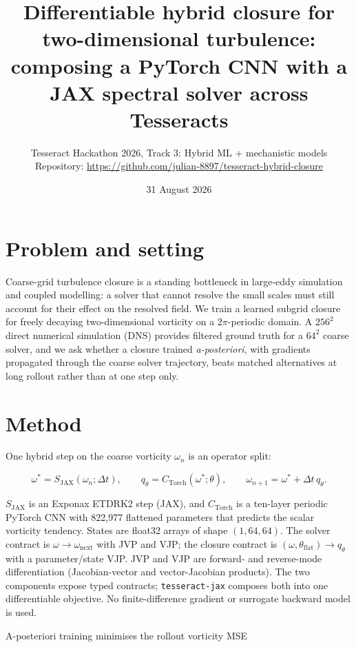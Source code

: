 \documentclass[10pt]{article}
\title{\textbf{Differentiable hybrid closure for two-dimensional turbulence:\\composing a PyTorch CNN with a JAX spectral solver across Tesseracts}}
\author{Tesseract Hackathon 2026, Track 3: Hybrid ML + mechanistic models\\[2pt]
\small Repository: \url{https://github.com/julian-8897/tesseract-hybrid-closure}}
\date{31 August 2026}
\begin{document}
\maketitle

\section*{Problem and setting}

Coarse-grid turbulence closure is a standing bottleneck in large-eddy simulation and coupled modelling: a solver that cannot resolve the small scales must still account for their effect on the resolved field. We train a learned subgrid closure for freely decaying two-dimensional vorticity on a $2\pi$-periodic domain. A $256^2$ direct numerical simulation (DNS) provides filtered ground truth for a $64^2$ coarse solver, and we ask whether a closure trained \emph{a-posteriori}, with gradients propagated through the coarse solver trajectory, beats matched alternatives at long rollout rather than at one step only.

\section*{Method}

One hybrid step on the coarse vorticity $\omega_n$ is an operator split:

\begin{equation}
  \omega^* = S_{\mathrm{JAX}}(\omega_n; \Delta t), \qquad
  q_\theta = C_{\mathrm{Torch}}(\omega^*; \theta), \qquad
  \omega_{n+1} = \omega^* + \Delta t\, q_\theta .
\end{equation}

$S_{\mathrm{JAX}}$ is an Exponax ETDRK2 step (JAX), and $C_{\mathrm{Torch}}$ is a ten-layer periodic PyTorch CNN with 822{,}977 flattened parameters that predicts the scalar vorticity tendency. States are float32 arrays of shape $(1,64,64)$. The solver contract is $\omega \to \omega_{\mathrm{next}}$ with JVP and VJP; the closure contract is $(\omega, \theta_{\mathrm{flat}}) \to q_\theta$ with a parameter/state VJP. JVP and VJP are forward- and reverse-mode differentiation (Jacobian-vector and vector-Jacobian products). The two components expose typed contracts; \texttt{tesseract-jax} composes both into one differentiable objective. No finite-difference gradient or surrogate backward model is used.

A-posteriori training minimises the rollout vorticity MSE
\end{document}
